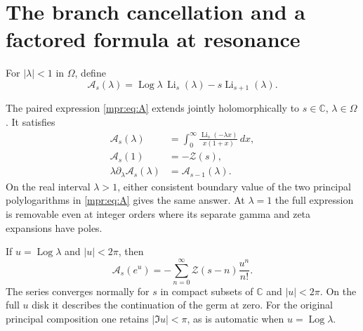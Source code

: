 \section{The branch cancellation and a factored formula at resonance}
\label{mpr:sec:resonance}

For $|\lambda|<1$ in $\Omega$, define
\begin{equation}\label{mpr:eq:A}
 \mathcal A_s(\lambda)
    =\operatorname{Log}\lambda\,\operatorname{Li}_s(\lambda)
                         -s\operatorname{Li}_{s+1}(\lambda).
\end{equation}

\begin{theorem}
\label{mpr:thm:A}
The paired expression \eqref{mpr:eq:A} extends jointly holomorphically
to $s\in\mathbb C$, $\lambda\in\Omega$.  It satisfies
\begin{align}
 \mathcal A_s(\lambda)
    &=\int_0^\infty
        \frac{\operatorname{Li}_s(-\lambda x)}{x(1+x)}\,dx,
          \label{mpr:eq:Aintegral}\\
 \mathcal A_s(1)&=-\mathscr Z(s),
          \label{mpr:eq:Aone}\\
 \lambda\partial_\lambda\mathcal A_s(\lambda)
          &=\mathcal A_{s-1}(\lambda).
          \label{mpr:eq:Aderivative}
\end{align}
On the real interval $\lambda>1$, either consistent boundary value of
the two principal polylogarithms in \eqref{mpr:eq:A} gives the same
answer.  At $\lambda=1$ the full expression is removable even at
integer orders where its separate gamma and zeta expansions have poles.

If $u=\operatorname{Log}\lambda$ and $|u|<2\pi$, then
\begin{equation}\label{mpr:eq:localexpansion}
 \boxed{\displaystyle
 \mathcal A_s(e^u)
      =-\sum_{n=0}^\infty\mathscr Z(s-n)\frac{u^n}{n!}.}
\end{equation}
The series converges normally for $s$ in compact subsets of $\mathbb C$
and $|u|<2\pi$.  On the full $u$ disk it describes the continuation of
the germ at zero.  For the original principal composition one retains
$|\Im u|<\pi$, as is automatic when $u=\operatorname{Log}\lambda$.
\end{theorem}

